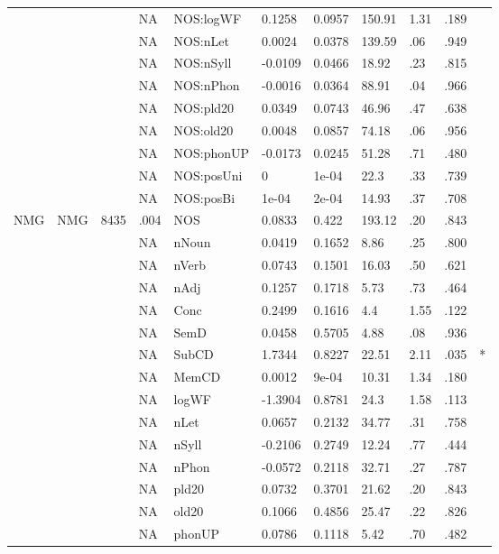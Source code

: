 \begin{table}[ht]
\begin{tabular}{lllllllllll}
   &  &  & NA & NOS:logWF & 0.1258 & 0.0957 & 150.91 & 1.31 & .189 &   \\ 
   &  &  & NA & NOS:nLet & 0.0024 & 0.0378 & 139.59 & .06 & .949 &   \\ 
   &  &  & NA & NOS:nSyll & -0.0109 & 0.0466 & 18.92 & .23 & .815 &   \\ 
   &  &  & NA & NOS:nPhon & -0.0016 & 0.0364 & 88.91 & .04 & .966 &   \\ 
   &  &  & NA & NOS:pld20 & 0.0349 & 0.0743 & 46.96 & .47 & .638 &   \\ 
   &  &  & NA & NOS:old20 & 0.0048 & 0.0857 & 74.18 & .06 & .956 &   \\ 
   &  &  & NA & NOS:phonUP & -0.0173 & 0.0245 & 51.28 & .71 & .480 &   \\ 
   &  &  & NA & NOS:posUni & 0 & 1e-04 & 22.3 & .33 & .739 &   \\ 
   &  &  & NA & NOS:posBi & 1e-04 & 2e-04 & 14.93 & .37 & .708 &   \\ 
  NMG & NMG & 8435 & .004 & NOS & 0.0833 & 0.422 & 193.12 & .20 & .843 &   \\ 
   &  &  & NA & nNoun & 0.0419 & 0.1652 & 8.86 & .25 & .800 &   \\ 
   &  &  & NA & nVerb & 0.0743 & 0.1501 & 16.03 & .50 & .621 &   \\ 
   &  &  & NA & nAdj & 0.1257 & 0.1718 & 5.73 & .73 & .464 &   \\ 
   &  &  & NA & Conc & 0.2499 & 0.1616 & 4.4 & 1.55 & .122 &   \\ 
   &  &  & NA & SemD & 0.0458 & 0.5705 & 4.88 & .08 & .936 &   \\ 
   &  &  & NA & SubCD & 1.7344 & 0.8227 & 22.51 & 2.11 & .035 & * \\ 
   &  &  & NA & MemCD & 0.0012 & 9e-04 & 10.31 & 1.34 & .180 &   \\ 
   &  &  & NA & logWF & -1.3904 & 0.8781 & 24.3 & 1.58 & .113 &   \\ 
   &  &  & NA & nLet & 0.0657 & 0.2132 & 34.77 & .31 & .758 &   \\ 
   &  &  & NA & nSyll & -0.2106 & 0.2749 & 12.24 & .77 & .444 &   \\ 
   &  &  & NA & nPhon & -0.0572 & 0.2118 & 32.71 & .27 & .787 &   \\ 
   &  &  & NA & pld20 & 0.0732 & 0.3701 & 21.62 & .20 & .843 &   \\ 
   &  &  & NA & old20 & 0.1066 & 0.4856 & 25.47 & .22 & .826 &   \\ 
   &  &  & NA & phonUP & 0.0786 & 0.1118 & 5.42 & .70 & .482 &   \\ 

\end{tabular}
\end{table}
